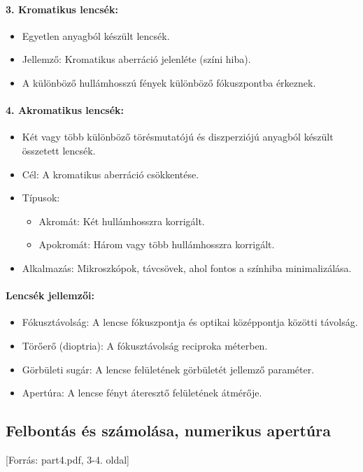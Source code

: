 \documentclass[a4paper,12pt]{article}
\begin{document}
\paragraph{3. Kromatikus lencsék:} \begin{itemize} \item Egyetlen anyagból készült lencsék. \item Jellemző: Kromatikus aberráció jelenléte (színi hiba). \item A különböző hullámhosszú fények különböző fókuszpontba érkeznek. \end{itemize}

\paragraph{4. Akromatikus lencsék:} \begin{itemize} \item Két vagy több különböző törésmutatójú és diszperziójú anyagból készült összetett lencsék. \item Cél: A kromatikus aberráció csökkentése. \item Típusok: \begin{itemize} \item Akromát: Két hullámhosszra korrigált. \item Apokromát: Három vagy több hullámhosszra korrigált. \end{itemize} \item Alkalmazás: Mikroszkópok, távcsövek, ahol fontos a színhiba minimalizálása. \end{itemize}

\paragraph{Lencsék jellemzői:} \begin{itemize} \item Fókusztávolság: A lencse fókuszpontja és optikai középpontja közötti távolság. \item Törőerő (dioptria): A fókusztávolság reciproka méterben. \item Görbületi sugár: A lencse felületének görbületét jellemző paraméter. \item Apertúra: A lencse fényt áteresztő felületének átmérője. \end{itemize}

\subsection{Felbontás és számolása, numerikus apertúra} [Forrás: part4.pdf, 3-4. oldal]
\end{document}
